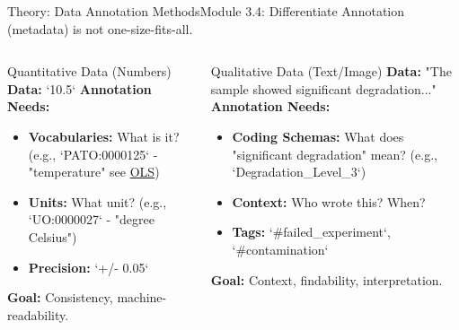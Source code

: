 \begin{frame}{Theory: Data Annotation Methods}{Module 3.4: Differentiate}
    Annotation (metadata) is not one-size-fits-all.
    
    \begin{columns}
        \begin{block}{Quantitative Data (Numbers)}
            \textbf{Data:} `10.5`
            \textbf{Annotation Needs:}
            \begin{itemize}
                \item \textbf{Vocabularies:} What is it? (e.g., `PATO:0000125` - "temperature" see \href{https://www.ebi.ac.uk/ols4/}{OLS})
                \item \textbf{Units:} What unit? (e.g., `UO:0000027` - "degree Celsius")
                \item \textbf{Precision:} `+/- 0.05`
            \end{itemize}
            \textbf{Goal:} Consistency, machine-readability.
        \end{block}
        
        \begin{block}{Qualitative Data (Text/Image)}
            \textbf{Data:} "The sample showed significant degradation..."
            \textbf{Annotation Needs:}
            \begin{itemize}
                \item \textbf{Coding Schemas:} What does "significant degradation" mean? (e.g., `Degradation\_Level\_3`)
                \item \textbf{Context:} Who wrote this? When?
                \item \textbf{Tags:} `\#failed\_experiment`, `\#contamination`
            \end{itemize}
            \textbf{Goal:} Context, findability, interpretation.
        \end{block}
    \end{columns}
\end{frame}

